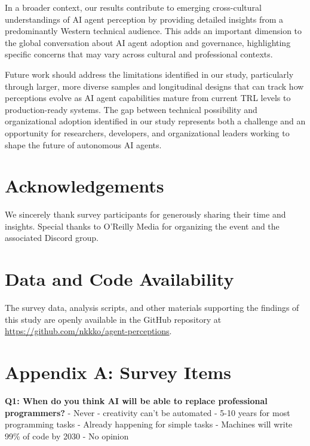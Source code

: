 \documentclass{article}
\begin{document}
In a broader context, our results contribute to emerging cross-cultural
understandings of AI agent perception \citep{LiuCHI2024} by providing
detailed insights from a predominantly Western technical audience. This
adds an important dimension to the global conversation about AI agent
adoption and governance, highlighting specific concerns that may vary
across cultural and professional contexts.

Future work should address the limitations identified in our study,
particularly through larger, more diverse samples and longitudinal
designs that can track how perceptions evolve as AI agent capabilities
mature from current TRL levels to production-ready systems. The gap
between technical possibility and organizational adoption identified in
our study represents both a challenge and an opportunity for
researchers, developers, and organizational leaders working to shape the
future of autonomous AI agents.

\section{Acknowledgements}\label{acknowledgements}

We sincerely thank survey participants for generously sharing their time and insights. Special thanks to O'Reilly Media for organizing the event and the associated Discord group.

\section*{Data and Code Availability} %
The survey data, analysis scripts, and other materials supporting the findings of this study are openly available in the GitHub repository at \url{https://github.com/nkkko/agent-perceptions}.




\section{Appendix A: Survey Items}\label{appendix-a-survey-items}

\textbf{Q1: When do you think AI will be able to replace professional
	programmers?} - Never - creativity can't be automated - 5-10 years for
most programming tasks - Already happening for simple tasks - Machines
will write 99\% of code by 2030 - No opinion
\end{document}
